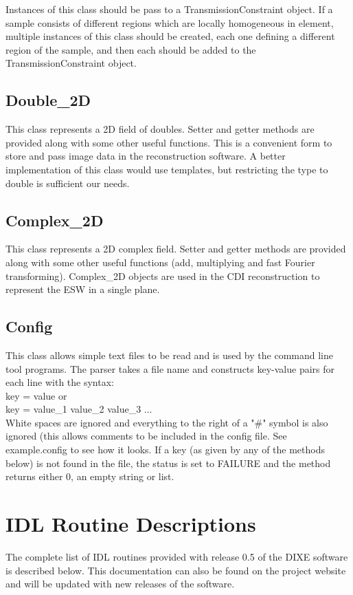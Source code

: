 \documentclass[]{cxs-software}
\begin{document}
Instances of this class should be pass to a TransmissionConstraint
object. If a sample consists of different regions which are locally
homogeneous in element, multiple instances of this class should be
created, each one defining a different region of the sample, and then
each should be added to the TransmissionConstraint object.

\subsection{Double\_2D}
This class represents a 2D field of doubles. Setter and getter methods
are provided along with some other useful functions. This is a
convenient form to store and pass image data in the reconstruction
software. A better implementation of this class would use templates,
but restricting the type to double is sufficient our needs.

\subsection{Complex\_2D}
This class represents a 2D complex field. Setter and getter methods
are provided along with some other useful functions (add, multiplying
and fast Fourier transforming). Complex\_2D objects are used in the CDI
reconstruction to represent the ESW in a single plane.

\subsection{Config}
This class allows simple text files to be read and is used by the
command line tool programs. The parser takes a file name and
constructs key-value pairs for each line with the syntax:\\ 
key = value or \\
key = value\_1 value\_2 value\_3 ... \\
White spaces are ignored and everything to the right of a "\#" symbol
is also ignored (this allows comments to be included in the config
file. See example.config to see how it looks. If a key (as given by
any of the methods below) is not found in the file, the status is set
to FAILURE and the method returns either 0, an empty string or list.


\section{IDL Routine Descriptions}
\label{sec:idl_routines}
The complete list of IDL routines provided with release 0.5 of the
DIXE software is described below. This documentation can also be found
on the project website and will be updated with new releases of the
software.
\end{document}

